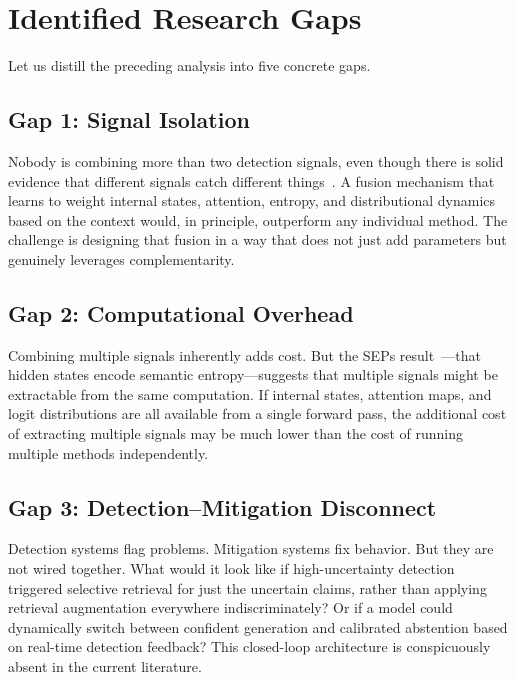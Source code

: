 \documentclass[journal]{IEEEtran}
\begin{document}
\section{Identified Research Gaps}

Let us distill the preceding analysis into five concrete gaps.

\subsection{Gap 1: Signal Isolation}

Nobody is combining more than two detection signals, even though there is solid evidence that different signals catch different things~\cite{map_misbelief, rauq, llmcheck}. A fusion mechanism that learns to weight internal states, attention, entropy, and distributional dynamics based on the context would, in principle, outperform any individual method. The challenge is designing that fusion in a way that does not just add parameters but genuinely leverages complementarity.

\subsection{Gap 2: Computational Overhead}

Combining multiple signals inherently adds cost. But the SEPs result~\cite{sep}---that hidden states encode semantic entropy---suggests that multiple signals might be extractable from the same computation. If internal states, attention maps, and logit distributions are all available from a single forward pass, the additional cost of extracting multiple signals may be much lower than the cost of running multiple methods independently.

\subsection{Gap 3: Detection--Mitigation Disconnect}

Detection systems flag problems. Mitigation systems fix behavior. But they are not wired together. What would it look like if high-uncertainty detection triggered selective retrieval for just the uncertain claims, rather than applying retrieval augmentation everywhere indiscriminately? Or if a model could dynamically switch between confident generation and calibrated abstention based on real-time detection feedback? This closed-loop architecture is conspicuously absent in the current literature.
\end{document}
